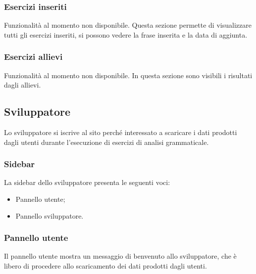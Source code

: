         
        
        
        \subsubsection{Esercizi inseriti}
        
        Funzionalità al momento non disponibile. Questa sezione permette di visualizzare tutti gli esercizi inseriti, si possono vedere la frase inserita e la data di aggiunta.
        
        
        
        
        \subsubsection{Esercizi allievi}        
         Funzionalità al momento non disponibile. In questa sezione sono visibili i risultati dagli allievi.
        
        
        
        
	\newpage
    \subsection{Sviluppatore}
    Lo sviluppatore si iscrive al sito perché interessato a scaricare i dati prodotti dagli utenti durante l'esecuzione di esercizi di analisi grammaticale.
    	\subsubsection{Sidebar} 
    	  La sidebar dello sviluppatore presenta le seguenti voci:
    		\begin{itemize}
    			\item Pannello utente;
    			\item Pannello sviluppatore.
    		\end{itemize}
    
    
    
    
    	\subsubsection{Pannello utente}
    	  Il pannello utente mostra un messaggio di benvenuto allo sviluppatore, che è libero di procedere allo scaricamento dei dati prodotti dagli utenti.



